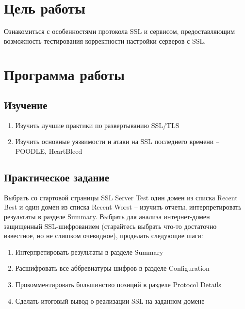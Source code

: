 \documentclass[a4paper]{article}
\begin{document}
\vfill %


\tableofcontents
\newpage



\section{Цель работы}

Ознакомиться с особенностями протокола SSL и сервисом, предоставляющим возможность тестирования корректности настройки серверов с SSL.

\section{Программа работы}

\subsection{Изучение}

\begin{enumerate}

\item Изучить лучшие практики по развертыванию SSL/TLS

\item Изучить основные уязвимости и атаки на SSL последнего времени – POODLE, HeartBleed

\end{enumerate}

\subsection{Практическое задание}

Выбрать со стартовой страницы SSL Server Test один домен из списка Recent Best и один домен из списка Recent Worst – изучить отчеты, интерпретировать результаты в разделе Summary. Выбрать для анализа интернет-домен защищенный SSL-шифрованием (старайтесь выбрать что-то достаточно известное, но не слишком очевидное), проделать следующие шаги:

\begin{enumerate}

\item Интерпретировать результаты в разделе Summary

\item Расшифровать все аббревиатуры шифров в разделе Configuration

\item Прокомментировать большинство позиций в разделе Protocol Details

\item Сделать итоговый вывод о реализации SSL на заданном домене

\end{enumerate}
\end{document}
